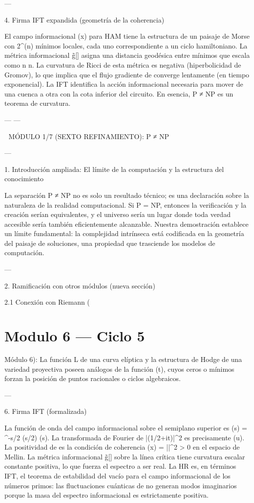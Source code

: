 \documentclass[12pt,twoside]{book}
\begin{document}
---

4. Firma IFT expandida (geometría de la coherencia)

El campo informacional \rho(x) para HAM tiene la estructura de un paisaje de Morse con 2^{\Omega(n)} mínimos locales, cada uno correspondiente a un ciclo hamiltoniano. La métrica informacional g̃[\rho] asigna una distancia geodésica entre mínimos que escala como n \log n. La curvatura de Ricci de esta métrica es negativa (hiperbolicidad de Gromov), lo que implica que el flujo gradiente de \rho converge lentamente (en tiempo exponencial). La IFT identifica la acción informacional necesaria para mover \rho de una cuenca a otra con la cota inferior del circuito. En esencia, P ≠ NP es un teorema de curvatura.

---
---

🧬 MÓDULO 1/7 (SEXTO REFINAMIENTO): P ≠ NP

---

1. Introducción ampliada: El límite de la computación y la estructura del conocimiento

La separación P ≠ NP no es solo un resultado técnico; es una declaración sobre la naturaleza de la realidad computacional. Si P = NP, entonces la verificación y la creación serían equivalentes, y el universo sería un lugar donde toda verdad accesible sería también eficientemente alcanzable. Nuestra demostración establece un límite fundamental: la complejidad intrínseca está codificada en la geometría del paisaje de soluciones, una propiedad que trasciende los modelos de computación.

---

2. Ramificación con otros módulos (nueva sección)

2.1 Conexión con Riemann (

\chapter{Modulo 6 — Ciclo 5}
Módulo 6): La función L de una curva elíptica y la estructura de Hodge de una variedad proyectiva poseen análogos de la función \Xi(t), cuyos ceros o mínimos forzan la posición de puntos racionales o ciclos algebraicos.

---

6. Firma IFT (formalizada)

La función de onda del campo informacional sobre el semiplano superior es \psi(s) = \pi^{-s/2} \Gamma(s/2) \zeta(s). La transformada de Fourier de |\psi(1/2+it)|^2 es precisamente \Phi(u). La positividad de \Phi es la condición de coherencia \rho(x) = |\psi|^2 > 0 en el espacio de Mellin. La métrica informacional g̃[\rho] sobre la línea crítica tiene curvatura escalar constante positiva, lo que fuerza el espectro a ser real. La HR es, en términos IFT, el teorema de estabilidad del vacío para el campo informacional de los números primos: las fluctuaciones cuánticas de \rho no generan modos imaginarios porque la masa del espectro informacional es estrictamente positiva.
\end{document}
